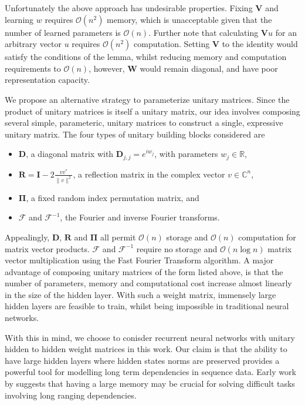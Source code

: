 \documentclass{article} %
\newcommand{\matr}[1]{\mathbf{#1}}
\newcommand\RR{\mathbb{R}}
\begin{document}
Unfortunately the above approach has undesirable properties. 
Fixing $\matr{V}$ and learning $w$ requires $\mathcal{O}\left(n^2\right)$ memory, 
which is unacceptable given that the number of learned parameters is $\mathcal{O}(n)$. 
Further note that calculating $\matr{V} u$ for an arbitrary vector $u$ 
requires $\mathcal{O}(n^2)$ computation. 
Setting $\matr{V}$ to the identity would satisfy the conditions of the lemma, whilst reducing  
memory and computation requirements to $\mathcal{O}(n)$, however, $\matr{W}$ would remain diagonal, 
and have poor representation capacity.

We propose an alternative strategy to parameterize unitary matrices. 
Since the product of unitary matrices is itself a unitary matrix, our idea involves
composing several simple, parameteric, unitary matrices to construct a single, expressive unitary matrix.
The four types of unitary building blocks considered are 

\begin{itemize}
  \item $\matr{D}$, a diagonal matrix with $\matr{D}_{j,j} = e^{i w_j}$, with parameters $w_j \in \RR$,
  \item $\matr{R} = \matr{I} - 2 \frac{v v^*}{\|v\|^2}$, a reflection matrix in the complex vector 
  $v \in \mathbb{C}^n$, 
  \item $\matr{\Pi}$, a fixed random index permutation matrix, and
  \item $\mathcal{F}$ and $\mathcal{F}^{-1}$, the Fourier and inverse Fourier transforms.
\end{itemize}

Appealingly, $\matr{D}$, $\matr{R}$ and $\matr{\Pi}$ all permit $\mathcal{O}(n)$ storage and 
$\mathcal{O}(n)$ computation for matrix vector products. $\mathcal{F}$ and $\mathcal{F}^{-1}$
require no storage and $\mathcal{O}(n \log n)$ matrix vector multiplication using the Fast Fourier
Transform algorithm. A major advantage of composing unitary matrices of the form listed above, is 
that the number of parameters, memory and computational cost increase almost linearly in the size
of the hidden layer. With such a weight matrix, immensely large hidden layers are feasible to train, 
whilst being impossible in traditional neural networks. 
 
With this in mind, we choose to conisder recurrent neural networks with unitary hidden to hidden
weight matrices in this work. Our claim is that the ability to have large hidden layers where hidden 
states norms are preserved provides a powerful tool for modelling long term dependencies in sequence data. 
Early work by \cite{Yoshua94} suggests that having a large memory may be crucial for solving 
difficult tasks involving long ranging dependencies.
\end{document}
